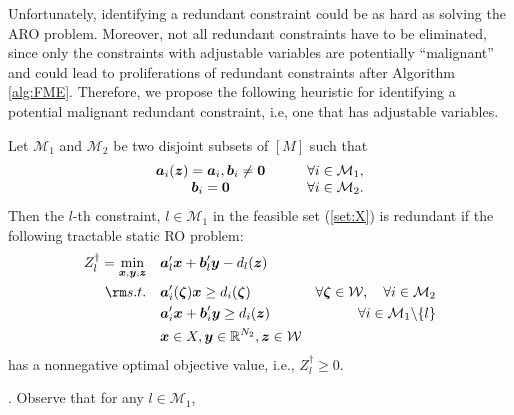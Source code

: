\documentclass[fleqn,isre,blindrev]{informs4}
\newcommand{\mb}[1]{\mbox{\boldmath \ensuremath{#1}}}
\renewcommand{\Re}{\mathbb{R}}
\begin{document}
		
		Unfortunately, identifying a redundant constraint could be as hard as solving the ARO problem.  Moreover, not all redundant constraints have to be eliminated,  since only the constraints with adjustable variables are potentially ``malignant''  and could lead to proliferations of redundant constraints after  Algorithm \ref{alg:FME}. Therefore, we propose the following heuristic for identifying a potential malignant redundant constraint, i.e, one that has adjustable variables.
		\begin{theorem} \label{thm:RCI}
     	Let $\mathcal{M}_1$ and $\mathcal{M}_2$  be two  disjoint subsets of $[M]$ such that 
\begin{equation*}
			\begin{array}{cl}
			\mb{a}_i(\mb{z}) = \mb{a}_i,  \mb{b}_i \neq \mb{0} &\qquad \forall i \in \mathcal{M}_1,\\
			\mb{b}_i = \mb{0} & \qquad \forall i \in \mathcal{M}_2.
			\end{array}
\end{equation*}
			Then the $l$-th constraint, $l \in \mathcal{M}_1$  in the feasible set (\ref{set:X}) is redundant if  the following tractable static RO problem:
\begin{equation} \label{mol:RCI}
				\begin{aligned} 
					Z^\dag_l =	\min_{ \boldsymbol{x} , \boldsymbol{y}, \boldsymbol{z}} \quad & \mb{a}'_l\mb{x}+\mb{b}'_l \mb{y} - d_l(\mb{z})  \\
					{\rm s.t.}  \quad &  \mb{a}'_i(\mb{\zeta})\mb{x} \geq d_i(\mb{\zeta}) &  \forall  \mb{\zeta} \in  \mathcal{W}, \quad \forall i  \in \mathcal{M}_2  \\
					\quad & \mb{a}'_i\mb{x}+\mb{b}'_i \mb{y} \geq d_i(\mb{z})  &  \forall i  \in \mathcal{M}_1 \backslash \{l\} \\
					\quad & \mb{x} \in X , \mb{y} \in \Re^{N_2}, \mb{z} \in \mathcal{W}
				\end{aligned}
\end{equation}
			has a nonnegative optimal objective value, i.e., $ Z^\dag_l\ge 0$.	
		\end{theorem}
		. 
		Observe that for  any $l \in \mathcal{M}_1$,
\end{document}
